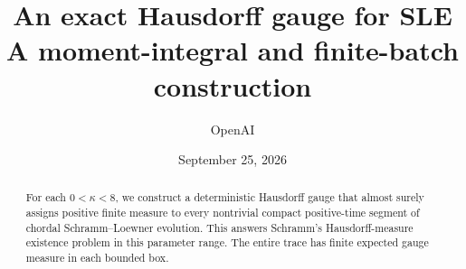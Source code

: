 \documentclass[11pt]{article}
\title{An exact Hausdorff gauge for SLE\\[4pt]
\large A moment-integral and finite-batch construction}
\author{OpenAI}
\date{September 25, 2026}
\begin{document}
\maketitle
\begin{abstract}
For each \(0<\kappa<8\), we construct a deterministic Hausdorff gauge
that almost surely assigns positive finite measure to every nontrivial
compact positive-time segment of chordal Schramm--Loewner evolution.
This answers Schramm's Hausdorff-measure existence problem in this
parameter range. The entire trace has finite expected gauge measure
in each bounded box.
\end{abstract}










\end{document}
